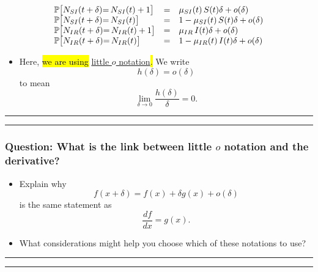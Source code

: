 \documentclass[]{article}
\providecommand{\tightlist}{%
  \setlength{\itemsep}{0pt}\setlength{\parskip}{0pt}}
\begin{document}
\[\begin{array}{lcl}
\mathbb{P}\big[N_{SI}(t+\delta){=\,} N_{SI}(t)+1\big] &=& \mu_{SI}(t) \, S(t) \delta + o(\delta)
\\
\mathbb{P}\big[N_{SI}(t+\delta){=\,} N_{SI}(t)\big] &=& 1-\mu_{SI}(t) \, S(t) \delta + o(\delta)
\\
\mathbb{P}\big[N_{IR}(t+\delta){=\,} N_{IR}(t)+1\big] &=& \mu_{IR} \, I(t) \delta + o(\delta)
\\
\mathbb{P}\big[N_{IR}(t+\delta){=\,} N_{IR}(t)\big] &=& 1-\mu_{IR}(t) \, I(t) \delta + o(\delta)
\end{array}\]

\begin{itemize}
\tightlist
\item
  Here, \hl{we are using}
  \href{https://en.wikipedia.org/wiki/Big_O_notation\#Little-o_notation}{little
  $o$ notation}\hl{.} We write \[ h(\delta)=o(\delta)\] to mean
  \[ \lim_{\delta\to 0} \frac{h(\delta)}{\delta} = 0.\]
\end{itemize}

\begin{center}\rule{0.5\linewidth}{\linethickness}\end{center}

\begin{center}\rule{0.5\linewidth}{\linethickness}\end{center}

\subsubsection{\texorpdfstring{Question: What is the link between little
\(o\) notation and the
derivative?}{Question: What is the link between little o notation and the derivative?}}\label{question-what-is-the-link-between-little-o-notation-and-the-derivative}

\begin{itemize}
\item
  Explain why \[f(x+\delta)=f(x)+ \delta g(x) + o(\delta)\] is the same
  statement as \[ \frac{df}{dx} = g(x).\]
\item
  What considerations might help you choose which of these notations to
  use?
\end{itemize}

\begin{center}\rule{0.5\linewidth}{\linethickness}\end{center}

\begin{center}\rule{0.5\linewidth}{\linethickness}\end{center}
\end{document}
